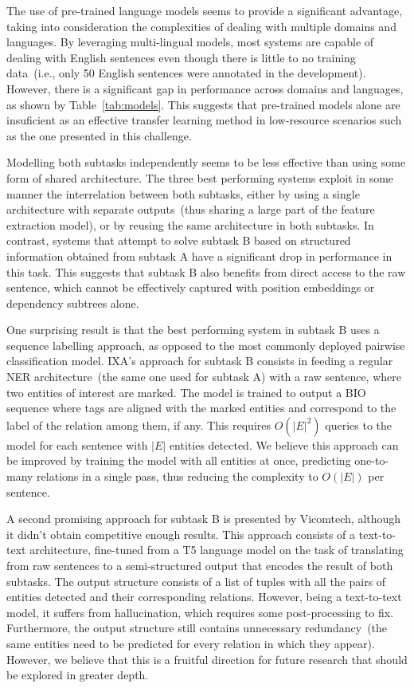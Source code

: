 \documentclass[a4paper,11pt,twocolumn,twoside]{article}
\begin{document}
The use of pre-trained language models seems to provide a significant advantage, taking into consideration the complexities of dealing with multiple domains and languages.
By leveraging multi-lingual models, most systems are capable of dealing with English sentences even though there is little to no training data~(i.e., only 50 English sentences were annotated in the development).
However, there is a significant gap in performance across domains and languages, as shown by Table~\ref{tab:models}.
This suggests that pre-trained models alone are insuficient as an effective transfer learning method in low-resource scenarios such as the one presented in this challenge.

Modelling both subtasks independently seems to be less effective than using some form of shared architecture.
The three best performing systems exploit in some manner the interrelation between both subtasks, either by using a single architecture with separate outputs~(thus sharing a large part of the feature extraction model), or by reusing the same architecture in both subtasks.
In contrast, systems that attempt to solve subtask B based on structured information obtained from subtask A have a significant drop in performance in this task.
This suggests that subtask B also benefits from direct access to the raw sentence, which cannot be effectively captured with position embeddings or dependency subtrees alone.

One surprising result is that the best performing system in subtask B uses a sequence labelling approach, as opposed to the most commonly deployed pairwise classification model.
IXA's approach for subtask B consists in feeding a regular NER architecture~(the same one used for subtask A) with a raw sentence, where two entities of interest are marked.
The model is trained to output a BIO sequence where tags are aligned with the marked entities and correspond to the label of the relation among them, if any.
This requires $O(|E|^2)$ queries to the model for each sentence with $|E|$ entities detected.
We believe this approach can be improved by training the model with all entities at once, predicting one-to-many relations in a single pass, thus reducing the complexity to $O(|E|)$ per sentence.

A second promising approach for subtask B is presented by Vicomtech, although it didn't obtain competitive enough results.
This approach consists of a text-to-text architecture, fine-tuned from a T5 language model on the task of translating from raw sentences to a semi-structured output that encodes the result of both subtasks.
The output structure consists of a list of tuples with all the pairs of entities detected and their corresponding relations.
However, being a text-to-text model, it suffers from hallucination, which requires some post-processing to fix.
Furthermore, the output structure still contains unnecessary redundancy~(the same entities need to be predicted for every relation in which they appear).
However, we believe that this is a fruitful direction for future research that should be explored in greater depth.
\end{document}
